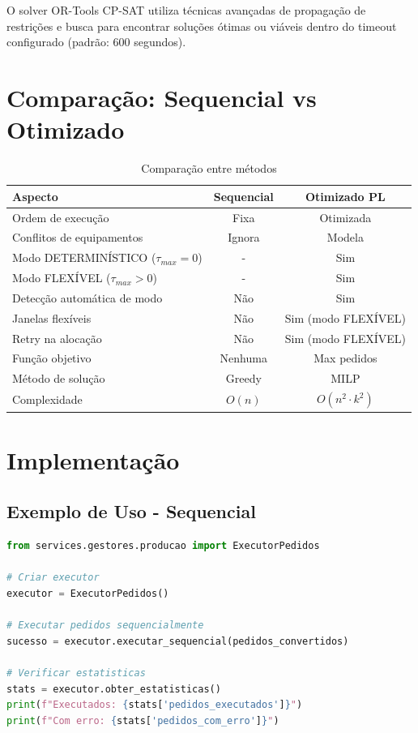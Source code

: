 \documentclass[12pt,a4paper]{article}
\begin{document}
O solver OR-Tools CP-SAT utiliza técnicas avançadas de propagação de restrições e busca para encontrar soluções ótimas ou viáveis dentro do timeout configurado (padrão: 600 segundos).

\section{Comparação: Sequencial vs Otimizado}

\begin{table}[h]
\centering
\begin{tabular}{lcc}
\toprule
\textbf{Aspecto} & \textbf{Sequencial} & \textbf{Otimizado PL} \\
\midrule
Ordem de execução & Fixa & Otimizada \\
Conflitos de equipamentos & Ignora & Modela \\
Modo DETERMINÍSTICO ($\tau_{max}=0$) & - & Sim \\
Modo FLEXÍVEL ($\tau_{max}>0$) & - & Sim \\
Detecção automática de modo & Não & Sim \\
Janelas flexíveis & Não & Sim (modo FLEXÍVEL) \\
Retry na alocação & Não & Sim (modo FLEXÍVEL) \\
Função objetivo & Nenhuma & Max pedidos \\
Método de solução & Greedy & MILP \\
Complexidade & $O(n)$ & $O(n^2 \cdot k^2)$ \\
\bottomrule
\end{tabular}
\caption{Comparação entre métodos}
\end{table}

\section{Implementação}

\subsection{Exemplo de Uso - Sequencial}

\begin{lstlisting}[language=Python, basicstyle=\ttfamily\small]
from services.gestores.producao import ExecutorPedidos

# Criar executor
executor = ExecutorPedidos()

# Executar pedidos sequencialmente
sucesso = executor.executar_sequencial(pedidos_convertidos)

# Verificar estatisticas
stats = executor.obter_estatisticas()
print(f"Executados: {stats['pedidos_executados']}")
print(f"Com erro: {stats['pedidos_com_erro']}")
\end{lstlisting}
\end{document}

